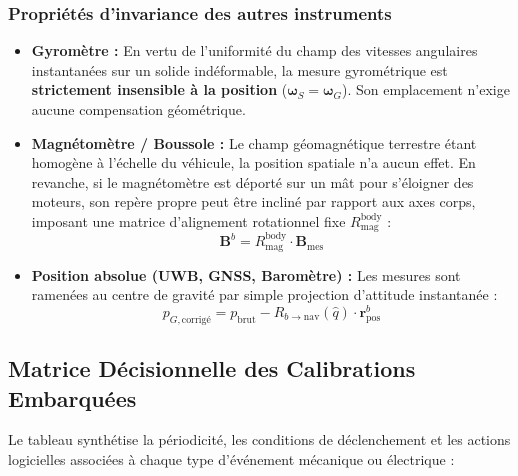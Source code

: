 \documentclass[../Implementation.tex]{subfiles}
\begin{document}
\subsubsection{Propriétés d'invariance des autres instruments}
\begin{itemize}
    \item \textbf{Gyromètre :} En vertu de l'uniformité du champ des vitesses angulaires instantanées sur un solide indéformable, la mesure gyrométrique est \textbf{strictement insensible à la position} ($\boldsymbol{\omega}_S = \boldsymbol{\omega}_G$). Son emplacement n'exige aucune compensation géométrique.
    \item \textbf{Magnétomètre / Boussole :} Le champ géomagnétique terrestre étant homogène à l'échelle du véhicule, la position spatiale n'a aucun effet. En revanche, si le magnétomètre est déporté sur un mât pour s'éloigner des moteurs, son repère propre peut être incliné par rapport aux axes corps, imposant une matrice d'alignement rotationnel fixe $R_{\text{mag}}^{\text{body}}$ :
    \begin{equation}
        \mathbf{B}^b = R_{\text{mag}}^{\text{body}} \cdot \mathbf{B}_{\text{mes}}
    \end{equation}
    \item \textbf{Position absolue (UWB, GNSS, Baromètre) :} Les mesures sont ramenées au centre de gravité par simple projection d'attitude instantanée :
    \begin{equation}
        p_{G,\text{corrigé}} = p_{\text{brut}} - R_{b \to \text{nav}}(\hat{q}) \cdot \mathbf{r}_{\text{pos}}^b
    \end{equation}
\end{itemize}

\subsection{Matrice Décisionnelle des Calibrations Embarquées}

Le tableau synthétise la périodicité, les conditions de déclenchement et les actions logicielles associées à chaque type d'événement mécanique ou électrique :
\end{document}
